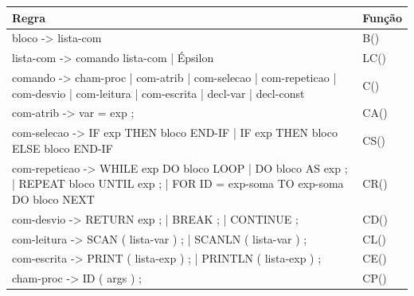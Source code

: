 \documentclass[12pt,oneside,a4paper,chapter=TITLE,section=TITLE,sumario=tradicional]{abntex2}
\begin{document}
\begin{quadro}[htb]
    \centering
    \vspace{0.5cm}
    \begin{tabular}[h]{|p{13.0cm}|p{2.0cm}|}
        \hline
        \textbf{Regra} & \textbf{Função} \\ 
        \hline\hline
	bloco -> lista-com  & B()   \\ \hline 
	lista-com -> comando lista-com | Épsilon  & LC()   \\ \hline 
	comando -> cham-proc | com-atrib | com-selecao | com-repeticao | com-desvio | com-leitura | com-escrita | decl-var | decl-const  & C()   \\ \hline 
	com-atrib -> var = exp ;  & CA()   \\ \hline 
	com-selecao -> IF exp THEN bloco END-IF | IF exp THEN bloco ELSE bloco END-IF  & CS()   \\ \hline 
	com-repeticao -> WHILE  exp DO bloco LOOP | DO bloco AS  exp  ; |  REPEAT bloco UNTIL exp ; | FOR ID = exp-soma TO exp-soma DO bloco NEXT  & CR()   \\ \hline 
	com-desvio -> RETURN exp ; | BREAK ; | CONTINUE ;  & CD()   \\ \hline 
	com-leitura -> SCAN ( lista-var ) ; | SCANLN ( lista-var ) ;  & CL()   \\ \hline 
	com-escrita -> PRINT ( lista-exp ) ; | PRINTLN ( lista-exp ) ;  & CE()   \\ \hline 
	cham-proc -> ID ( args ) ;  & CP()   \\ \hline 
    \end{tabular}    
\end{quadro}
\end{document}

